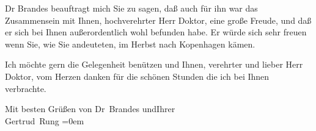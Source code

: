 \pstart
           Dr Brandes beauftragt mich Sie {\pb}zu
               sagen, daß auch für ihn war das Zusammensein mit Ihnen, hochverehrter Herr Doktor,
               eine große Freude, und daß er sich bei Ihnen außerordentlich wohl befunden habe. Er
               würde sich sehr freuen wenn Sie, wie Sie andeuteten, im Herbst nach Kopenhagen kämen.\pend
           
\pstart
           Ich möchte gern die Gelegenheit benützen und Ihnen, verehrter und lieber Herr Doktor,
               vom Herzen danken für die schönen Stunden die ich bei Ihnen verbrachte.\pend
           
\pstart
           Mit besten Grüßen von Dr Brandes
                  und\hspace*{2.5em}Ihrer{\\[\baselineskip]}\spacefill\mbox{Gertrud Rung}\pend
           \leftskip=0em{}\endnumbering{}  
      